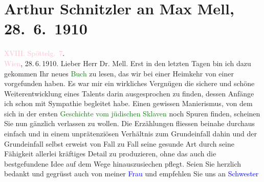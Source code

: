 

               \section[Arthur Schnitzler an Max Mell, 28. 6. 1910]{ Arthur Schnitzler an Max Mell, 28. 6. 1910}\nopagebreak{}\rehead{ }\normalsize\beginnumbering{} \toendnotes[C]{\smallbreak\pagebreak[2]} 
\toendnotes[C]{\smallbreak}\pstart
           \raggedleft{}{\pb}\textcolor{pink}{XVIII. Spöttelg. 7}{}\ledrightnote{\textcolor{pink}{Edmund-Weiß-Gasse}}.{\\}\textcolor{pink}{Wien}{}\ledrightnote{\textcolor{pink}{Wien}}, 28. 6. 1910.\pend
           \pstart\center{}Lieber Herr Dr. Mell.\pend\pstart
           Erst in den letzten Tagen bin ich dazu gekommen Ihr neues \textcolor{green}{Buch}{} zu lesen, das wir bei einer
                    Heimkehr von einer \label{K_L01940_1v}\label{K_L01940_1h}
                    vorgefunden haben. Es war mir ein wirkliches Vergnügen die sichere und schöne
                    Weiterentwicklung eines Talents darin ausgesprochen zu finden, dessen Anfänge
                    ich schon mit Sympathie begleitet habe. Einen gewissen Manierismus, von dem sich
                    in der ersten \textcolor{green}{Geschichte vom jüdischen Sklaven}{}\ledrightnote{\textcolor{green}{Geschichte eines jüdischen Sklaven}}
                    noch Spuren finden, scheinen Sie nun gänzlich verlassen zu wollen. Die
                    Erzählungen fliessen beinahe durchaus einfach und in einem unprätenziösen
                    Verhältnis zum Grundeinfall dahin und der Grundeinfall selbst erweist von Fall
                    zu Fall seine gesunde Art durch seine Fähigkeit allerlei kräftiges Detail zu
                    produzieren, ohne das auch die bestgefundene Idee auf dem Wege hinauszusiechen
                    pflegt.\pend
           \pstart
           Seien Sie herzlich bedankt und gegrüsst auch von meiner \textcolor{blue}{Frau}{} und empfehlen Sie uns an \textcolor{blue}{Schwester}{}\pend
           \endnumbering{}  
      